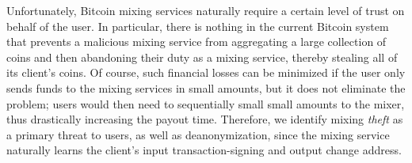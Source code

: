 Unfortunately, Bitcoin mixing services naturally require a certain level of trust on behalf of the user. In particular, there is nothing in the current Bitcoin system that prevents a malicious mixing service from aggregating a large collection of coins and then abandoning their duty as a mixing service, thereby stealing all of its client's coins. Of course, such financial losses can be minimized if the user only sends funds to the mixing services in small amounts, but it does not eliminate the problem; users would then need to sequentially small small amounts to the mixer, thus drastically increasing the payout time. Therefore, we identify mixing \emph{theft} as a primary threat to users, as well as deanonymization, since the mixing service naturally learns the client's input transaction-signing and output change address.

